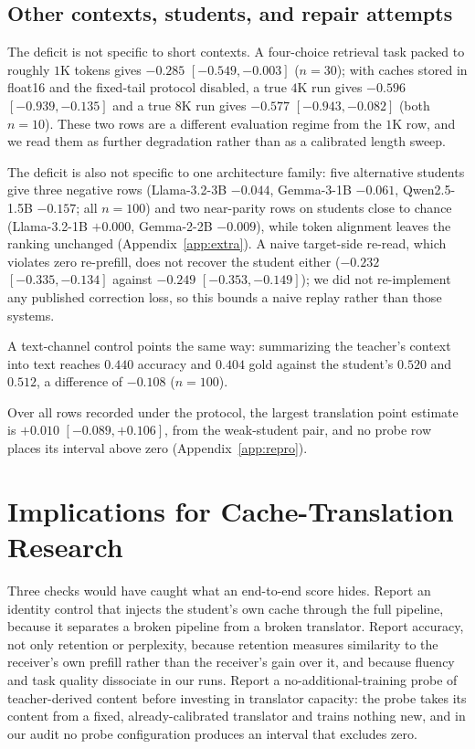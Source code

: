 \documentclass{article} %
\begin{document}
\subsection{Other contexts, students, and repair attempts}
The deficit is not specific to short contexts. A four-choice retrieval task
packed to roughly $1$K tokens gives $-0.285$ $[-0.549,-0.003]$ ($n{=}30$);
with caches stored in float16 and the fixed-tail protocol disabled, a true
$4$K run gives $-0.596$ $[-0.939,-0.135]$ and a true $8$K run gives $-0.577$
$[-0.943,-0.082]$ (both $n{=}10$). These two rows are a different evaluation
regime from the $1$K row, and we read them as further degradation rather than as
a calibrated length sweep.

The deficit is also not specific to one architecture family: five alternative
students give three negative rows (Llama-3.2-3B $-0.044$, Gemma-3-1B $-0.061$,
Qwen2.5-1.5B $-0.157$; all $n{=}100$) and two near-parity rows on students
close to chance (Llama-3.2-1B $+0.000$, Gemma-2-2B $-0.009$), while token
alignment leaves the ranking unchanged (Appendix~\ref{app:extra}). A naive
target-side re-read, which violates zero re-prefill, does not recover the
student either ($-0.232$ $[-0.335,-0.134]$ against $-0.249$ $[-0.353,-0.149]$);
we did not re-implement any published correction loss, so this bounds a naive
replay rather than those systems.

A text-channel control points the same way: summarizing the teacher's context
into text reaches $0.440$ accuracy and $0.404$ gold against the student's $0.520$
and $0.512$, a difference of $-0.108$ ($n{=}100$).

Over all rows recorded under the protocol, the largest translation point
estimate is $+0.010$ $[-0.089,+0.106]$, from the weak-student pair, and no probe
row places its interval above zero (Appendix~\ref{app:repro}).


\section{Implications for Cache-Translation Research}
\label{sec:implications}

Three checks would have caught what an end-to-end score hides. Report an identity
control that injects the student's own cache through the full pipeline, because
it separates a broken pipeline from a broken translator. Report accuracy, not
only retention or perplexity, because retention measures similarity to the
receiver's own prefill rather than the receiver's gain over it, and because
fluency and task quality dissociate in our runs. Report a no-additional-training probe of teacher-derived
content before investing in translator capacity: the probe takes its content from
a fixed, already-calibrated translator and trains nothing new, and in our audit
no probe configuration produces an interval that excludes zero.
\end{document}
